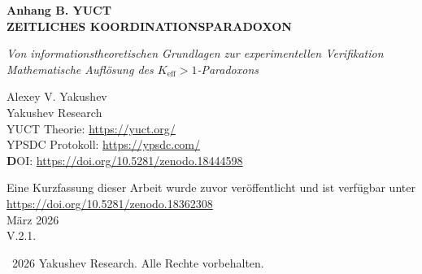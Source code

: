 \documentclass[12pt]{article}
\begin{document}
	\begin{titlepage}
		\begin{center}
			\vspace*{0cm}
			\Huge\textbf{Anhang B. YUCT\\
				ZEITLICHES KOORDINATIONSPARADOXON}
			
			\vspace{0cm}
			\LARGE\textit{Von informationstheoretischen Grundlagen zur experimentellen Verifikation \\
				Mathematische Auflösung des $K_{\text{eff}} > 1$-Paradoxons}
			
			\vspace{1cm}
			\Large
			Alexey V. Yakushev\\
			Yakushev Research\\
			YUCT Theorie: \url{https://yuct.org/}\\
			YPSDC Protokoll: \url{https://ypsdc.com/}\\
			
			
			\vspace{2cm}
			\textbf DOI: \url{https://doi.org/10.5281/zenodo.18444598}\\
			
			\vspace{1cm}
			
			\vspace{0cm}
			\large 
			Eine Kurzfassung dieser Arbeit wurde zuvor veröffentlicht und ist verfügbar unter\\ \url{https://doi.org/10.5281/zenodo.18362308}\\
			\vspace{1cm}
			März 2026 \\ \large V.2.1.
			
			\vspace{5cm}
			\textcopyright~2026 Yakushev Research. Alle Rechte vorbehalten.
			

\end{center}
\end{titlepage}
\end{document}

